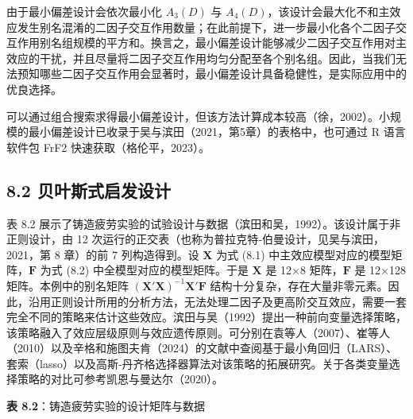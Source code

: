 \documentclass{ctexart}
\begin{document}
由于最小偏差设计会依次最小化 $A_3(D)$ 与 $A_4(D)$，该设计会最大化不和主效应发生别名混淆的二因子交互作用数量；在此前提下，进一步最小化各个二因子交互作用别名组规模的平方和。换言之，最小偏差设计能够减少二因子交互作用对主效应的干扰，并且尽量将二因子交互作用均匀分配至各个别名组。因此，当我们无法预知哪些二因子交互作用会显著时，最小偏差设计具备稳健性，是实际应用中的优良选择。

可以通过组合搜索求得最小偏差设计，但该方法计算成本较高（徐，2002）。小规模的最小偏差设计已收录于吴与滨田（2021，第5章）的表格中，也可通过 R 语言软件包 FrF2 快速获取（格伦平，2023）。

\subsection*{8.2 贝叶斯式启发设计}

表 8.2 展示了铸造疲劳实验的试验设计与数据（滨田和吴，1992）。该设计属于非正则设计，由 12 次运行的正交表（也称为普拉克特‑伯曼设计，见吴与滨田，2021，第 8 章）的前 7 列构造得到。设 $\boldsymbol{X}$ 为式 (8.1) 中主效应模型对应的模型矩阵，$\boldsymbol{F}$ 为式 (8.2) 中全模型对应的模型矩阵。于是 $\boldsymbol{X}$ 是 12×8 矩阵，$\boldsymbol{F}$ 是 12×128 矩阵。本例中的别名矩阵 $(\boldsymbol{X}'\boldsymbol{X})^{-1}\boldsymbol{X}'\boldsymbol{F}$ 结构十分复杂，存在大量非零元素。因此，沿用正则设计所用的分析方法，无法处理二因子及更高阶交互效应，需要一套完全不同的策略来估计这些效应。滨田与吴（1992）提出一种前向变量选择策略，该策略融入了效应层级原则与效应遗传原则。可分别在袁等人（2007）、崔等人（2010）以及辛格和施图夫肯（2024）的文献中查阅基于最小角回归（LARS）、套索（lasso）以及高斯‑丹齐格选择器算法对该策略的拓展研究。关于各类变量选择策略的对比可参考凯恩与曼达尔（2020）。

\begin{mdquote}
\textbf{表 8.2}：铸造疲劳实验的设计矩阵与数据
\end{mdquote}
\end{document}
